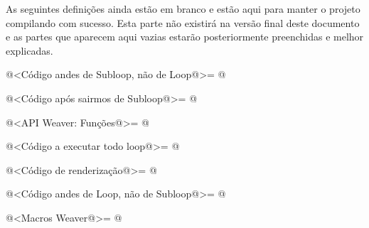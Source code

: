 
As seguintes definições ainda estão em branco e estão aqui para manter
o projeto compilando com sucesso. Esta parte não existirá na versão
final deste documento e as partes que aparecem aqui vazias estarão
posteriormente preenchidas e melhor explicadas.

\iniciocodigo
@<Código andes de Subloop, não de Loop@>=
@
\fimcodigo

\iniciocodigo
@<Código após sairmos de Subloop@>=
@
\fimcodigo

\iniciocodigo
@<API Weaver: Funções@>=
@
\fimcodigo

\iniciocodigo
@<Código a executar todo loop@>=
@
\fimcodigo

\iniciocodigo
@<Código de renderização@>=
@
\fimcodigo

\iniciocodigo
@<Código andes de Loop, não de Subloop@>=
@
\fimcodigo

\iniciocodigo
@<Macros Weaver@>=
@
\fimcodigo





\fim
